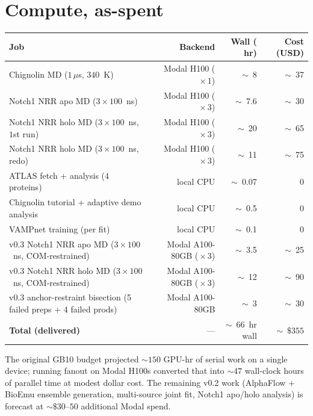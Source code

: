 \documentclass[11pt]{article}
\begin{document}
\section{Compute, as-spent}

\begin{center}
\begin{tabularx}{\linewidth}{X r r r}
\toprule
\textbf{Job} & \textbf{Backend} & \textbf{Wall ($\!$hr$\!$)} & \textbf{Cost (USD)} \\
\midrule
Chignolin MD ($1\,\mu$s, $340$~K)                & Modal H100 ($\!\times\!1$) & $\sim$~8     & $\sim$~37 \\
Notch1 NRR apo MD ($3 \times 100$~ns)            & Modal H100 ($\!\times\!3$) & $\sim$~7.6   & $\sim$~30 \\
Notch1 NRR holo MD ($3 \times 100$~ns, $1$st run)& Modal H100 ($\!\times\!3$) & $\sim$~20    & $\sim$~65 \\
Notch1 NRR holo MD ($3 \times 100$~ns, redo)     & Modal H100 ($\!\times\!3$) & $\sim$~11    & $\sim$~75 \\
ATLAS fetch + analysis ($4$ proteins)            & local CPU                  & $\sim$~0.07  & $0$ \\
Chignolin tutorial + adaptive demo analysis      & local CPU                  & $\sim$~0.5   & $0$ \\
VAMPnet training (per fit)                       & local CPU                  & $\sim$~0.1   & $0$ \\
v0.3 Notch1 NRR apo MD ($3 \times 100$~ns, COM-restrained) & Modal A100-80GB ($\!\times\!3$) & $\sim$~3.5   & $\sim$~25 \\
v0.3 Notch1 NRR holo MD ($3 \times 100$~ns, COM-restrained)& Modal A100-80GB ($\!\times\!3$) & $\sim$~12    & $\sim$~90 \\
v0.3 anchor-restraint bisection (5 failed preps + 4 failed prods) & Modal A100-80GB & $\sim$~3 & $\sim$~30 \\
\midrule
\textbf{Total (delivered)}                       & --- & $\sim$~$66$~hr wall & $\sim$~$\$355$ \\
\bottomrule
\end{tabularx}
\end{center}

The original GB10 budget projected $\sim\!150$ GPU-hr of serial work on
a single device; running fanout on Modal H100s converted that into
$\sim\!47$ wall-clock hours of parallel time at modest dollar cost.
The remaining v0.2 work (AlphaFlow + BioEmu ensemble generation,
multi-source joint fit, Notch1 apo/holo analysis) is forecast at
$\sim\!\$30$--$50$ additional Modal spend.
\end{document}
